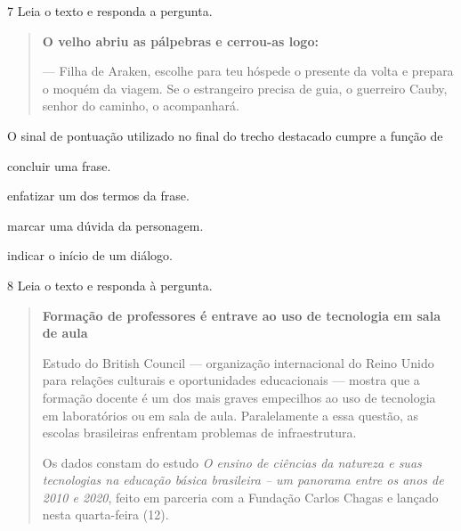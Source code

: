 \num{7} Leia o texto e responda a pergunta.

\begin{quote}
\textbf{O velho abriu as pálpebras e cerrou-as logo:}

--- Filha de Araken, escolhe para teu hóspede o presente da volta e
prepara o moquém da viagem. Se o estrangeiro precisa de guia, o
guerreiro Cauby, senhor do caminho, o acompanhará.

\end{quote}

O sinal de pontuação utilizado no final do trecho destacado cumpre a
função de

\begin{escolha}
  \item concluir uma frase.

  \item enfatizar um dos termos da frase.

  \item marcar uma dúvida da personagem.

  \item indicar o início de um diálogo.
\end{escolha}

\pagebreak
\num{8} Leia o texto e responda à pergunta.

\begin{quote}
\textbf{Formação de professores é entrave ao uso de tecnologia em sala de
aula}

Estudo do British Council --- organização internacional do Reino Unido
para relações culturais e oportunidades educacionais --- mostra que a
formação docente é um dos mais graves empecilhos ao uso de tecnologia em
laboratórios ou em sala de aula. Paralelamente a essa questão, as
escolas brasileiras enfrentam problemas de infraestrutura.

Os dados constam do estudo \textit{O ensino de ciências da natureza e suas
tecnologias na educação básica brasileira -- um panorama entre os anos
de 2010 e 2020}, feito em parceria com a Fundação Carlos Chagas e lançado
nesta quarta-feira (12).

\end{quote}


